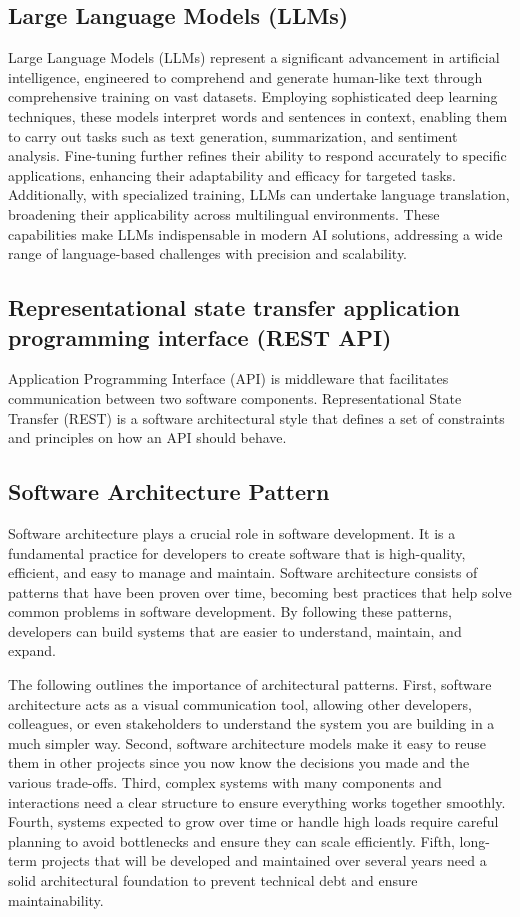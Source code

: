     \subsection{Large Language Models (LLMs)}
    Large Language Models (LLMs) represent a significant advancement in artificial intelligence, engineered to comprehend and generate human-like text through comprehensive training on vast datasets. Employing sophisticated deep learning techniques, these models interpret words and sentences in context, enabling them to carry out tasks such as text generation, summarization, and sentiment analysis. Fine-tuning further refines their ability to respond accurately to specific applications, enhancing their adaptability and efficacy for targeted tasks. Additionally, with specialized training, LLMs can undertake language translation, broadening their applicability across multilingual environments. These capabilities make LLMs indispensable in modern AI solutions, addressing a wide range of language-based challenges with precision and scalability.
    \subsection{Representational state transfer application programming interface (REST API)}
    Application Programming Interface (API) is middleware that facilitates communication between two software components. Representational State Transfer (REST) is a software architectural style that defines a set of constraints and principles on how an API should behave.
    \pagebreak
    \subsection{Software Architecture Pattern}
    Software architecture plays a crucial role in software development. It is a fundamental practice for developers to create software that is high-quality, efficient, and easy to manage and maintain. Software architecture consists of patterns that have been proven over time, becoming best practices that help solve common problems in software development. By following these patterns, developers can build systems that are easier to understand, maintain, and expand.
    \cite{Arslan}

    The following outlines the importance of architectural patterns. First, software architecture acts as a visual communication tool, allowing other developers, colleagues, or even stakeholders to understand the system you are building in a much simpler way. Second, software architecture models make it easy to reuse them in other projects since you now know the decisions you made and the various trade-offs. Third, complex systems with many components and interactions need a clear structure to ensure everything works together smoothly. Fourth, systems expected to grow over time or handle high loads require careful planning to avoid bottlenecks and ensure they can scale efficiently. Fifth, long-term projects that will be developed and maintained over several years need a solid architectural foundation to prevent technical debt and ensure maintainability.
    \cite{Abbas}

